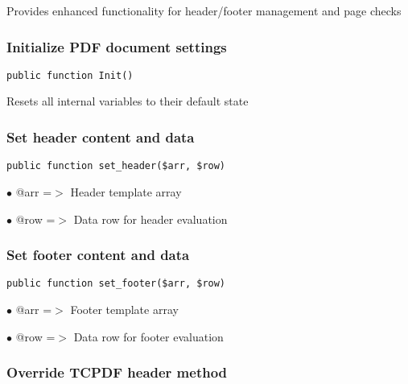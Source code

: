 \documentclass[a4paper]{article}
\begin{document}
Provides enhanced functionality for header/footer management and page checks

\hypertarget{toc503}{}
\subsubsection{Initialize PDF document settings}

\begin{lstlisting}
public function Init()
\end{lstlisting}

Resets all internal variables to their default state

\hypertarget{toc504}{}
\subsubsection{Set header content and data}

\begin{lstlisting}
public function set_header($arr, $row)
\end{lstlisting}

\begin{compactitem}
\item[\color{myblue}$\bullet$] @arr =$>$ Header template array
\item[\color{myblue}$\bullet$] @row =$>$ Data row for header evaluation
\end{compactitem}

\hypertarget{toc505}{}
\subsubsection{Set footer content and data}

\begin{lstlisting}
public function set_footer($arr, $row)
\end{lstlisting}

\begin{compactitem}
\item[\color{myblue}$\bullet$] @arr =$>$ Footer template array
\item[\color{myblue}$\bullet$] @row =$>$ Data row for footer evaluation
\end{compactitem}

\hypertarget{toc506}{}
\subsubsection{Override TCPDF header method}
\end{document}
